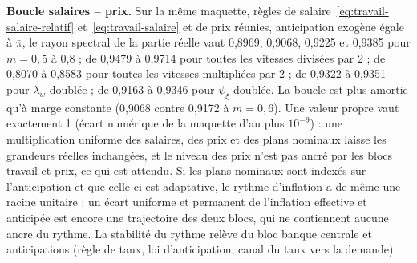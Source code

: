 \documentclass[11pt,a4paper]{article}
\begin{document}
\textbf{Boucle salaires -- prix.} Sur la même maquette, règles de salaire~\eqref{eq:travail-salaire-relatif} et~\eqref{eq:travail-salaire} et de prix réunies, anticipation exogène égale à $\bar\pi$, le rayon spectral de la partie réelle vaut 0,8969, 0,9068, 0,9225 et 0,9385 pour $m = 0{,}5$ à 0,8 ; de 0,9479 à 0,9714 pour toutes les vitesses divisées par 2 ; de 0,8070 à 0,8583 pour toutes les vitesses multipliées par 2 ; de 0,9322 à 0,9351 pour $\lambda_w$ doublée ; de 0,9163 à 0,9346 pour $\psi_\xi$ doublée. La boucle est plus amortie qu'à marge constante (0,9068 contre 0,9172 à $m = 0{,}6$). Une valeur propre vaut exactement 1 (écart numérique de la maquette d'au plus $10^{-9}$) : une multiplication uniforme des salaires, des prix et des plans nominaux laisse les grandeurs réelles inchangées, et le niveau des prix n'est pas ancré par les blocs travail et prix, ce qui est attendu. Si les plans nominaux sont indexés sur l'anticipation et que celle-ci est adaptative, le rythme d'inflation a de même une racine unitaire : un écart uniforme et permanent de l'inflation effective et anticipée est encore une trajectoire des deux blocs, qui ne contiennent aucune ancre du rythme. La stabilité du rythme relève du bloc banque centrale et anticipations (règle de taux, loi d'anticipation, canal du taux vers la demande).
\end{document}
